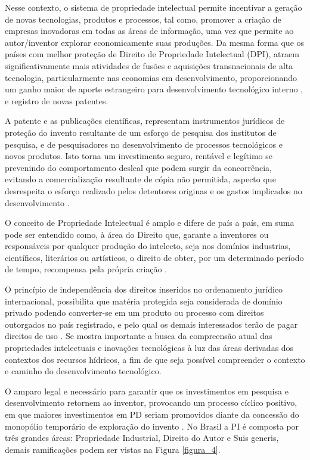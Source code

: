 Nesse contexto, o sistema de propriedade intelectual permite incentivar a geração de novas tecnologias, produtos e processos, tal como, promover a criação de empresas inovadoras em todas as áreas de informação, uma vez que permite ao autor/inventor explorar economicamente suas produções. Da mesma forma que os países com melhor proteção de Direito de Propriedade Intelectual (DPI), atraem significativamente mais atividades de fusões e aquisições transnacionais de alta tecnologia, particularmente nas economias em desenvolvimento, proporcionando um ganho maior de aporte estrangeiro para desenvolvimento tecnológico interno \cite{hasan_impacts_2017}, e registro de novas patentes. 

A patente e as publicações científicas, representam instrumentos jurídicos de proteção do invento resultante de um esforço de pesquisa dos institutos de pesquisa, e de pesquisadores no desenvolvimento de processos tecnológicos e novos produtos. Isto torna um investimento seguro, rentável e legítimo se prevenindo do comportamento desleal que podem surgir da concorrência, evitando a comercialização resultante de cópia não permitida, aspecto que desrespeita o esforço realizado pelos detentores originas e os gastos implicados no desenvolvimento \cite{marques_natureza_2017}.

O conceito de Propriedade Intelectual é amplo e difere de país a país, em suma pode ser entendido como, à área do Direito que, garante a inventores ou responsáveis por qualquer produção do intelecto, seja nos domínios industrias, científicos, literários ou artísticos, o direito de obter, por um determinado período de tempo, recompensa pela própria criação \cite{aspi_aspi_2019}.

O princípio de independência dos direitos inseridos no ordenamento jurídico internacional, possibilita que matéria protegida seja considerada de domínio privado podendo converter-se em um produto ou processo com direitos outorgados no país registrado, e pelo qual os demais interessados terão de pagar direitos de uso \cite{galvao_direitos_2002}. Se mostra importante a busca da compreensão atual das propriedades intelectuais e inovações tecnológicas à luz das áreas derivadas dos contextos dos recursos hídricos, a fim de que seja possível compreender o contexto e caminho do desenvolvimento tecnológico. 

O amparo legal e necessário para garantir que os investimentos em pesquisa e desenvolvimento retornem ao inventor, provocando um processo cíclico positivo, em que maiores investimentos em PD seriam promovidos diante da concessão do monopólio temporário de exploração do invento \cite{lima_sauglobal_2017}. No Brasil a PI é composta por três grandes áreas: Propriedade Industrial, Direito do Autor e Suis generis, demais ramificações podem ser vistas na Figura \ref{figura_4}.


